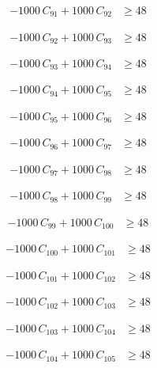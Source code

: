 \documentclass[a4paper,11pt]{article}
\begin{document}
\begin{align}
-1000\,C_{91} + 1000\,C_{92} &\geq 48 \nonumber
\end{align}

\begin{align}
-1000\,C_{92} + 1000\,C_{93} &\geq 48 \nonumber
\end{align}

\begin{align}
-1000\,C_{93} + 1000\,C_{94} &\geq 48 \nonumber
\end{align}

\begin{align}
-1000\,C_{94} + 1000\,C_{95} &\geq 48 \nonumber
\end{align}

\begin{align}
-1000\,C_{95} + 1000\,C_{96} &\geq 48 \nonumber
\end{align}

\begin{align}
-1000\,C_{96} + 1000\,C_{97} &\geq 48 \nonumber
\end{align}

\begin{align}
-1000\,C_{97} + 1000\,C_{98} &\geq 48 \nonumber
\end{align}

\begin{align}
-1000\,C_{98} + 1000\,C_{99} &\geq 48 \nonumber
\end{align}

\begin{align}
-1000\,C_{99} + 1000\,C_{100} &\geq 48 \nonumber
\end{align}

\begin{align}
-1000\,C_{100} + 1000\,C_{101} &\geq 48 \nonumber
\end{align}

\begin{align}
-1000\,C_{101} + 1000\,C_{102} &\geq 48 \nonumber
\end{align}

\begin{align}
-1000\,C_{102} + 1000\,C_{103} &\geq 48 \nonumber
\end{align}

\begin{align}
-1000\,C_{103} + 1000\,C_{104} &\geq 48 \nonumber
\end{align}

\begin{align}
-1000\,C_{104} + 1000\,C_{105} &\geq 48 \nonumber
\end{align}
\end{document}
